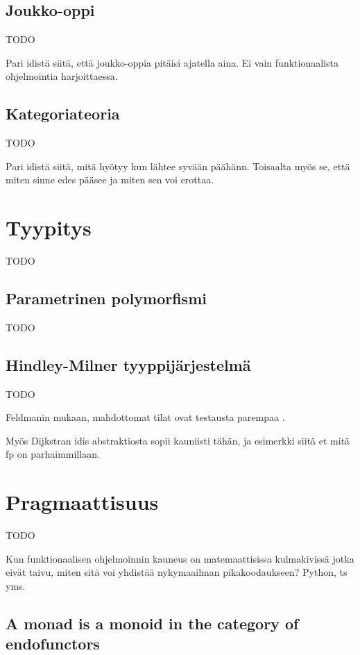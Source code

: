 \subsection{Joukko-oppi}

TODO

Pari idistä siitä, että joukko-oppia pitäisi ajatella aina. Ei vain funktionaalista ohjelmointia harjoittaessa.

\subsection{Kategoriateoria}

TODO

Pari idistä siitä, mitä hyötyy kun lähtee syvään päähänn. Toisaalta myös se, että miten sinne edes pääsee ja miten sen voi erottaa.

\section{Tyypitys}

TODO



\subsection{Parametrinen polymorfismi}

TODO


\subsection{Hindley-Milner tyyppijärjestelmä}

TODO

Feldmanin mukaan, mahdottomat tilat ovat testausta parempaa \cite{impossiblebetter}.

Myös Dijkstran idis abstraktiosta sopii kauniisti tähän, ja esimerkki siitä et mitä \gls{fp} on parhaimmillaan.

\section{Pragmaattisuus}

TODO

Kun funktionaalisen ohjelmoinnin kauneus on matemaattisissa kulmakivissä jotka eivät taivu, miten sitä voi yhdistää nykymaailman pikakoodaukseen? Python, \gls{ts} yms.


\subsection{A monad is a monoid in the category of endofunctors}

